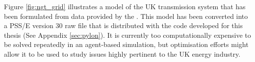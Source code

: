 Figure \ref{fig:ngt_grid} illustrates a model of the UK transmission system that
has been formulated from data provided by the .  This model
has been converted into a PSS/E version 30 raw file that is distributed with the
code developed for this thesis (See Appendix \ref{sec:pylon}).
It is currently too computationally expensive to be solved repeatedly in an
agent-based simulation, but optimisation efforts might allow it to be used
to study issues highly pertinent to the UK energy industry.

